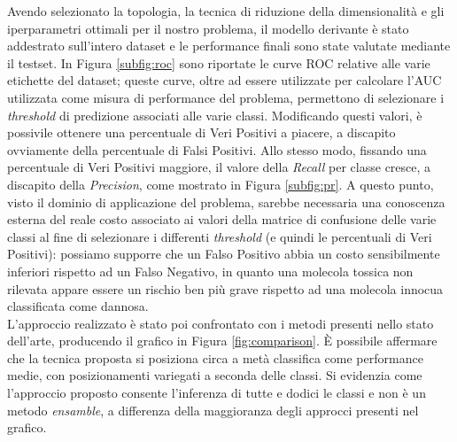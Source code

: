 Avendo selezionato la topologia, la tecnica di riduzione della dimensionalità e gli iperparametri ottimali per il nostro problema, il modello derivante è stato addestrato sull'intero dataset e le performance finali sono state valutate mediante il testset.
In Figura \ref{subfig:roc} sono riportate le curve ROC relative alle varie etichette del dataset; queste curve, oltre ad essere utilizzate per calcolare l'AUC utilizzata come misura di performance del problema, permettono di selezionare i \textit{threshold} di predizione associati alle varie classi. Modificando questi valori, è possivile ottenere una percentuale di Veri Positivi a piacere, a discapito ovviamente della percentuale di Falsi Positivi. Allo stesso modo, fissando una percentuale di Veri Positivi maggiore, il valore della \textit{Recall} per classe cresce, a discapito della \textit{Precision}, come mostrato in Figura \ref{subfig:pr}. A questo punto, visto il dominio di applicazione del problema, sarebbe necessaria una conoscenza esterna del reale costo associato ai valori della matrice di confusione delle varie classi al fine di selezionare i differenti \textit{threshold} (e quindi le percentuali di Veri Positivi): possiamo supporre che un Falso Positivo abbia un costo sensibilmente inferiori rispetto ad un Falso Negativo, in quanto una molecola tossica non rilevata appare essere un rischio ben più grave rispetto ad una molecola innocua classificata come dannosa.\\

L'approccio realizzato è stato poi confrontato con i metodi presenti nello stato dell'arte, producendo il grafico in Figura \ref{fig:comparison}. È possibile affermare che la tecnica proposta si posiziona circa a metà classifica come performance medie, con posizionamenti variegati a seconda delle classi. Si evidenzia come l'approccio proposto consente l'inferenza di tutte e dodici le classi e non è un metodo \textit{ensamble}, a differenza della maggioranza degli approcci presenti nel grafico.

